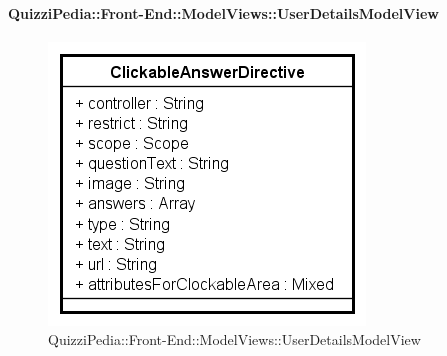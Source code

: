 \paragraph{QuizziPedia::Front-End::ModelViews::UserDetailsModelView}
		
		\label{QuizziPedia::Front-End::ModelViews::UserDetailsModelView}
		
		\begin{figure}[ht]
			\centering
			\includegraphics[scale=0.5,keepaspectratio]{UML/Classi/Front-End/QuizziPedia_Front-end_Templates_ClickableAnswerTemplate.png}
			\caption{QuizziPedia::Front-End::ModelViews::UserDetailsModelView}
		\end{figure} \FloatBarrier
		

